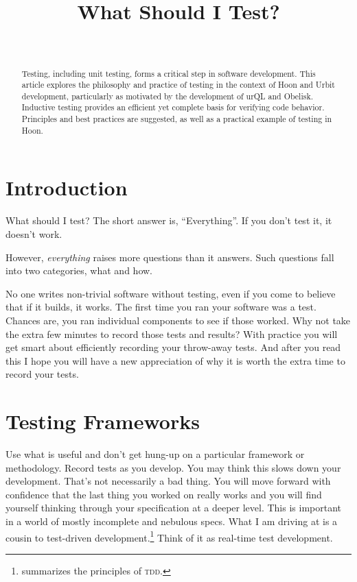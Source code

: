 \documentclass[twoside]{article}
\title{What Should I Test?}
\author{\authorname~\authorpatp \\ \affiliation}
\date{}
\begin{document}
\maketitle
\thispagestyle{firststyle}

\begin{abstract}
Testing, including unit testing, forms a critical step in software development.  This article explores the philosophy and practice of testing in the context of Hoon and Urbit development, particularly as motivated by the development of urQL and Obelisk.  Inductive testing provides an efficient yet complete basis for verifying code behavior.  Principles and best practices are suggested, as well as a practical example of testing in Hoon.
\end{abstract}

\setcounter{page}{1}

\tableofcontents

\section{Introduction}

What should I test?  The short answer is, “Everything”.  If you don't test it, it doesn't work.

However, \emph{everything} raises more questions than it answers. Such questions fall into two categories, what and how.

No one writes non-trivial software without testing, even if you come to believe that if it builds, it works. The first time you ran your software was a test. Chances are, you ran individual components to see if those worked. Why not take the extra few minutes to record those tests and results? With practice you will get smart about efficiently recording your throw-away tests. And after you read this I hope you will have a new appreciation of why it is worth the extra time to record your tests.

\section{Testing Frameworks}

Use what is useful and don't get hung-up on a particular framework or methodology. Record tests as you develop. You may think this slows down your development. That's not necessarily a bad thing. You will move forward with confidence that the last thing you worked on really works and you will find yourself thinking through your specification at a deeper level. This is important in a world of mostly incomplete and nebulous specs. What I am driving at is a cousin to test-driven development.\footnote{\citet{Beck2023} summarizes the principles of \textsc{tdd}.} Think of it as real-time test development.
\end{document}

